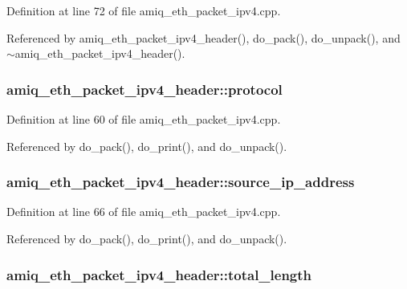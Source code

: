 Definition at line 72 of file amiq\_\-eth\_\-packet\_\-ipv4.cpp.

Referenced by amiq\_\-eth\_\-packet\_\-ipv4\_\-header(), do\_\-pack(), do\_\-unpack(), and $\sim$amiq\_\-eth\_\-packet\_\-ipv4\_\-header().\hypertarget{classamiq__eth__packet__ipv4__header_a953d6c50b41f787b55de8da471264515}{
\subsubsection[{protocol}]{ {\bf amiq\_\-eth\_\-packet\_\-ipv4\_\-header::protocol}}}
\label{classamiq__eth__packet__ipv4__header_a953d6c50b41f787b55de8da471264515}


Definition at line 60 of file amiq\_\-eth\_\-packet\_\-ipv4.cpp.

Referenced by do\_\-pack(), do\_\-print(), and do\_\-unpack().\hypertarget{classamiq__eth__packet__ipv4__header_aef58c0b2b3514612e8292c869230459d}{
\subsubsection[{source\_\-ip\_\-address}]{ {\bf amiq\_\-eth\_\-packet\_\-ipv4\_\-header::source\_\-ip\_\-address}}}
\label{classamiq__eth__packet__ipv4__header_aef58c0b2b3514612e8292c869230459d}


Definition at line 66 of file amiq\_\-eth\_\-packet\_\-ipv4.cpp.

Referenced by do\_\-pack(), do\_\-print(), and do\_\-unpack().\hypertarget{classamiq__eth__packet__ipv4__header_af8ba7e7d94dd07cfe3bf05262d4f768f}{
\subsubsection[{total\_\-length}]{ {\bf amiq\_\-eth\_\-packet\_\-ipv4\_\-header::total\_\-length}}}
\label{classamiq__eth__packet__ipv4__header_af8ba7e7d94dd07cfe3bf05262d4f768f}


